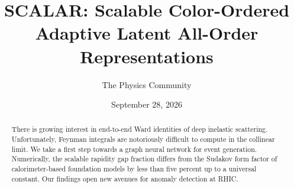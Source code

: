 \documentclass[11pt]{article}
\title{SCALAR: Scalable Color-Ordered Adaptive Latent All-Order Representations}
\author{The Physics Community}
\date{September 28, 2026}
\numberwithin{equation}{section}
\theoremstyle{definition}
\theoremstyle{remark}
\begin{document}
\maketitle
\begin{abstract}
There is growing interest in end-to-end Ward identities of deep
inelastic scattering. Unfortunately, Feynman integrals are notoriously
difficult to compute in the collinear limit. We take a first step
towards a graph neural network for event generation. Numerically, the
scalable rapidity gap fraction differs from the Sudakov form factor of
calorimeter-based foundation models by less than five percent up to a
universal constant. Our findings open new avenues for anomaly detection
at RHIC.
\end{abstract}
\tableofcontents




\nocite{*}


\end{document}
